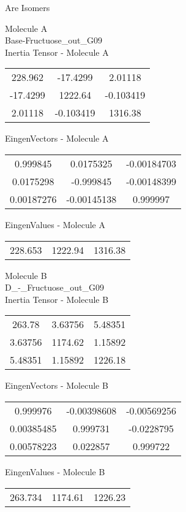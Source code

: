 \begin{center}
\vtab
\vtab
\textcolor{NavyBlue}{\Large Are Isomers}
\end{center}
\newpage
\begin{multicols}{2}
\begin{center}
Molecule A \\ 
Base-Fructuose\_out\_G09
\\
Inertia Tensor - Molecule A \\
\vtab
\begin{tabular}{|c c c|}
228.962	 & 	-17.4299	 & 	2.01118	 \\
-17.4299	 & 	1222.64	 & 	-0.103419	 \\
2.01118	 & 	-0.103419	 & 	1316.38
\end{tabular}

\vtab
 EingenVectors - Molecule A     \\
\vtab
\begin{tabular}{|c c c|}
0.999845	 & 	0.0175325	 & 	-0.00184703	 \\
0.0175298	 & 	-0.999845	 & 	-0.00148399	 \\
0.00187276	 & 	-0.00145138	 & 	0.999997
\end{tabular}

\vtab
 EingenValues - Molecule A     \\
\vtab
\begin{tabular}{|c c c|}
228.653	 & 	1222.94	 & 	1316.38
\end{tabular}
\columnbreak

Molecule B \\ 
D\_-\_Fructuose\_out\_G09
\\
Inertia Tensor - Molecule B \\
\vtab
\begin{tabular}{|c c c|}
263.78	 & 	3.63756	 & 	5.48351	 \\
3.63756	 & 	1174.62	 & 	1.15892	 \\
5.48351	 & 	1.15892	 & 	1226.18
\end{tabular}

\vtab
 EingenVectors - Molecule B     \\
\vtab
\begin{tabular}{|c c c|}
0.999976	 & 	-0.00398608	 & 	-0.00569256	 \\
0.00385485	 & 	0.999731	 & 	-0.0228795	 \\
0.00578223	 & 	0.022857	 & 	0.999722
\end{tabular}

\vtab
 EingenValues - Molecule B     \\
\vtab
\begin{tabular}{|c c c|}
263.734	 & 	1174.61	 & 	1226.23
\end{tabular}

\end{center}
\end{multicols}
